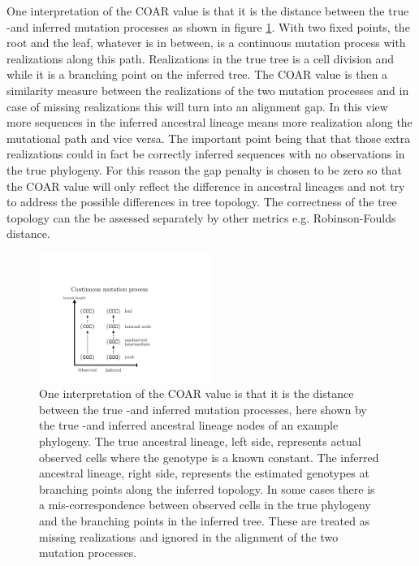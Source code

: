 One interpretation of the COAR value is that it is the distance between the true -and inferred mutation processes as shown in figure \ref{fig:mutation_process}.
With two fixed points, the root and the leaf, whatever is in between, is a continuous mutation process with realizations along this path.
Realizations in the true tree is a cell division and while it is a branching point on the inferred tree.
The COAR value is then a similarity measure between the realizations of the two mutation processes and in case of missing realizations this will turn into an alignment gap.
In this view more sequences in the inferred ancestral lineage means more realization along the mutational path and vice versa.
The important point being that that those extra realizations could in fact be correctly inferred sequences with no observations in the true phylogeny.
For this reason the gap penalty is chosen to be zero so that the COAR value will only reflect the difference in ancestral lineages and not try to address the possible differences in tree topology.
The correctness of the tree topology can the be assessed separately by other metrics e.g. Robinson-Foulds distance.
\begin{figure}[ht!]
    \centering
    \includegraphics[width=0.5\textwidth]{figures/mutation_process2.pdf}
    \caption{
        \label{fig:mutation_process}
        One interpretation of the COAR value is that it is the distance between the true -and inferred mutation processes, here shown by the true -and inferred ancestral lineage nodes of an example phylogeny. The true ancestral lineage, left side, represents actual observed cells where the genotype is a known constant. The inferred ancestral lineage, right side, represents the estimated genotypes at branching points along the inferred topology. In some cases there is a mis-correspondence between observed cells in the true phylogeny and the branching points in the inferred tree. These are treated as missing realizations and ignored in the alignment of the two mutation processes.
    }
\end{figure}





